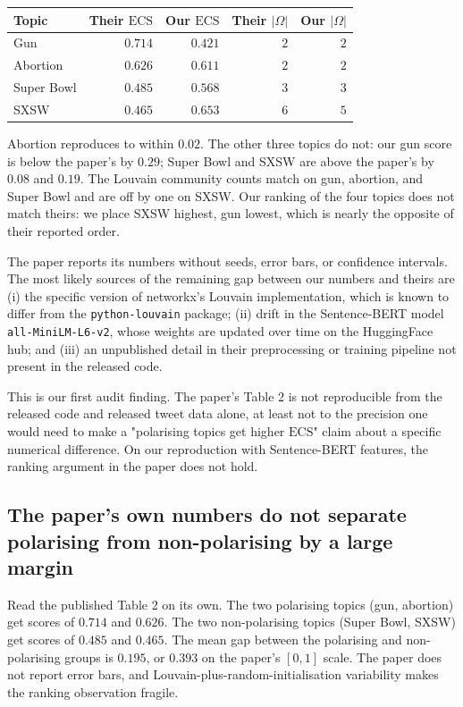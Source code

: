 \begin{center}
\begin{tabular}{lrrrr}
\hline
Topic & Their $\mathrm{ECS}$ & Our $\mathrm{ECS}$ & Their $|\Omega|$ & Our $|\Omega|$ \\
\hline
Gun        & $0.714$ & $0.421$ & $2$ & $2$ \\
Abortion   & $0.626$ & $0.611$ & $2$ & $2$ \\
Super Bowl & $0.485$ & $0.568$ & $3$ & $3$ \\
SXSW       & $0.465$ & $0.653$ & $6$ & $5$ \\
\hline
\end{tabular}
\end{center}

Abortion reproduces to within $0.02$. The other three topics do
not: our gun score is below the paper's by $0.29$; Super Bowl and
SXSW are above the paper's by $0.08$ and $0.19$. The Louvain
community counts match on gun, abortion, and Super Bowl and are
off by one on SXSW. Our ranking of the four topics does not match
theirs: we place SXSW highest, gun lowest, which is nearly the
opposite of their reported order.

The paper reports its numbers without seeds, error bars, or
confidence intervals. The most likely sources of the remaining
gap between our numbers and theirs are (i) the specific version
of networkx's Louvain implementation, which is known to differ
from the \texttt{python-louvain} package; (ii) drift in the
Sentence-BERT model \texttt{all-MiniLM-L6-v2}, whose weights are
updated over time on the HuggingFace hub; and (iii) an
unpublished detail in their preprocessing or training pipeline
not present in the released code.

This is our first audit finding. The paper's Table 2 is not
reproducible from the released code and released tweet data
alone, at least not to the precision one would need to make a
"polarising topics get higher $\mathrm{ECS}$" claim about a
specific numerical difference. On our reproduction with
Sentence-BERT features, the ranking argument in the paper does
not hold.

\subsection{The paper's own numbers do not separate polarising
from non-polarising by a large margin}

Read the published Table 2 on its own. The two polarising topics
(gun, abortion) get scores of $0.714$ and $0.626$. The two
non-polarising topics (Super Bowl, SXSW) get scores of $0.485$
and $0.465$. The mean gap between the polarising and
non-polarising groups is $0.195$, or $0.393$ on the paper's
$[0, 1]$ scale. The paper does not report error bars, and
Louvain-plus-random-initialisation variability makes the
ranking observation fragile.

